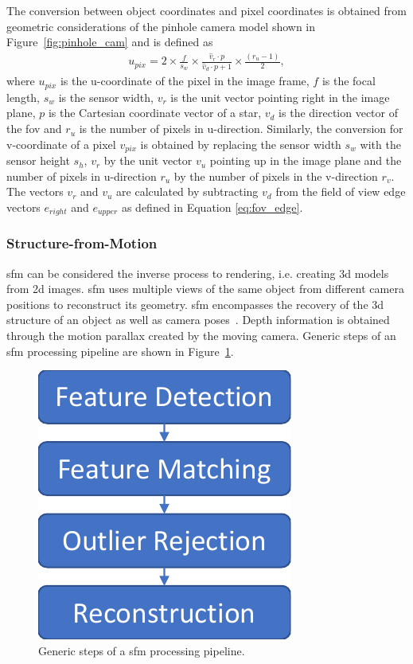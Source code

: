 The conversion between object coordinates and pixel coordinates is obtained from geometric considerations of the pinhole camera model shown in Figure~\ref{fig:pinhole_cam} and is defined as
\begin{align}
    u_{pix} = 2 \times \frac{f}{s_w} \times \frac{\hat{v}_r \cdot p}{\hat{v}_d \cdot p + 1} \times \frac{(r_u - 1)}{2}, \label{eq:pix_conversion} 
\end{align}
where $u_{pix}$ is the u-coordinate of the pixel in the image frame, $f$ is the focal length, $s_w$ is the sensor width, $v_r$ is the unit vector pointing right in the image plane, $p$ is the Cartesian coordinate vector of a star, $v_d$ is the direction vector of the \gls{fov} and $r_u$ is the number of pixels in u-direction. Similarly, the conversion for v-coordinate of a pixel $v_{pix}$ is obtained by replacing the sensor width $s_w$ with the sensor height $s_h$, $v_r$ by the unit vector $v_u$ pointing up in the image plane and the number of pixels in u-direction $r_u$ by the number of pixels in the v-direction $r_v$. The vectors $v_r$ and $v_u$ are calculated by subtracting $v_d$ from the field of view edge vectors $e_{right}$ and $e_{upper}$ as defined in Equation \ref{eq:fov_edge}.

\subsubsection{Structure-from-Motion}
\Gls{sfm} can be considered the inverse process to rendering, i.e. creating \gls{3d} models from \gls{2d} images. \gls{sfm} uses multiple views of the same object from different camera positions to reconstruct its geometry. \Gls{sfm} encompasses the recovery of the \gls{3d} structure of an object as well as camera poses~\cite{szeliski2010computer}. Depth information is obtained through the motion parallax created by the moving camera. Generic steps of an \gls{sfm} processing pipeline are shown in Figure~\ref{fig:sfm_steps}.

\begin{figure}[htb]
    \centering
    \includegraphics[width=.25\textwidth]{doc/thesis/0_figures/sfm/SfM.pdf}
    \caption{Generic steps of a \gls{sfm} processing pipeline.}
    \label{fig:sfm_steps}
\end{figure}

